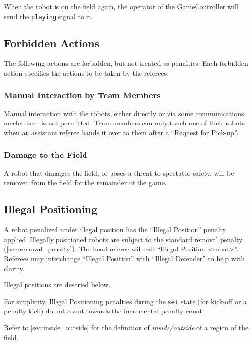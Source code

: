 When the robot is on the field again, the operator of the GameController will send the \texttt{playing} signal to it.

\subsection{Forbidden Actions}

The following actions are forbidden, but not treated as penalties.
Each forbidden action specifies the actions to be taken by the referees.

\subsubsection{Manual Interaction by Team Members}

Manual interaction with the robots, either directly or via some communications mechanism, is not permitted.
Team members can only touch one of their robots when an assistant referee hands it over to them after a ``Request for Pick-up''.

\subsubsection{Damage to the Field}
\label{sec:damage}

A robot that damages the field, or poses a threat to spectator safety, will be removed from the field for the remainder of the game.

\subsection{Illegal Positioning}
\label{sec:illegal_positioning}

A robot penalized under illegal position has the ``Illegal Position'' penalty applied.
Illegally positioned robots are subject to the standard removal penalty (\cf \cref{sec:removal_penalty}).
The head referee will call ``Illegal Position  \textless robot\textgreater''.
Referees may interchange ``Illegal Position'' with ``Illegal Defender'' to help with clarity.

Illegal positions are descried below.

For simplicity, Illegal Positioning penalties during the \texttt{set} state (for kick-off or a penalty kick) do not count towards the incremental penalty count.

Refer to \cref{sec:inside_outside} for the definition of \textit{inside/outside} of a region of the field.

